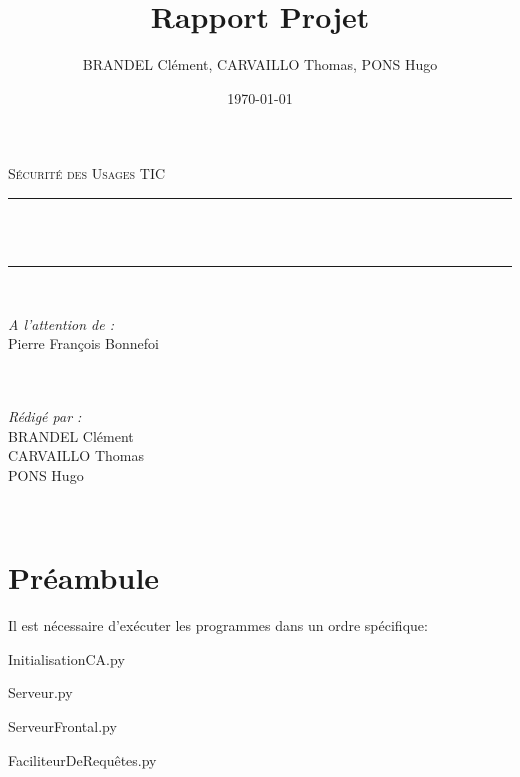 \documentclass[12pt]{article}
\title{Rapport Projet}
\author{BRANDEL Clément, CARVAILLO Thomas, PONS Hugo}
\date{\today}
\makeatletter
\let\thetitle\@title
\newcommand{\1}{\mathbbm{1}}
\makeatother
\begin{document}

\begin{titlepage}
	\centering
    \vspace*{0.5 cm}
    \textsc{\LARGE Sécurité des Usages TIC}\\[1.0 cm]
	\vspace{1.5cm}
	\rule{\linewidth}{0.2 mm} \\[0.4 cm]
	{ \huge \bfseries  \thetitle}\\ %
	\rule{\linewidth}{0.2 mm} \\[1.5 cm]
	
	\begin{minipage}{0.4\textwidth}
		\begin{flushleft} \large
			\emph{A l'attention de :}\\
			Pierre François Bonnefoi\\
			\phantom{a}\\
			\phantom{a}\\
		\end{flushleft}
	\end{minipage}
	\begin{minipage}{0.5\textwidth}
    	\begin{flushright} \large
		\emph{Rédigé par :}\\
		BRANDEL Clément \\
		CARVAILLO Thomas \\
		PONS Hugo \\
		\end{flushright}
	\end{minipage}\\[2 cm]
\end{titlepage}


\tableofcontents
\vspace{1cm}

\section{Préambule}
Il est nécessaire d'exécuter les programmes dans un ordre spécifique:

\begin{enumerate}
{\large	
	\item  InitialisationCA.py
	\item Serveur.py
	\item ServeurFrontal.py
	\item FaciliteurDeRequêtes.py
}
\end{enumerate}
\end{document}
